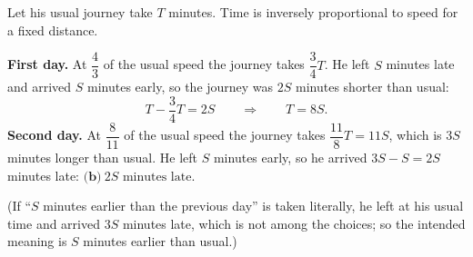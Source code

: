 Let his usual journey take $T$ minutes. Time is inversely proportional to speed for a fixed distance.

\textbf{First day.} At $\dfrac{4}{3}$ of the usual speed the journey takes $\dfrac{3}{4}T$. He left $S$ minutes late and arrived $S$ minutes early, so the journey was $2S$ minutes shorter than usual:
\[
T-\dfrac{3}{4}T=2S\qquad\Longrightarrow\qquad T=8S .
\]
\textbf{Second day.} At $\dfrac{8}{11}$ of the usual speed the journey takes $\dfrac{11}{8}T=11S$, which is $3S$ minutes longer than usual. He left $S$ minutes early, so he arrived $3S-S=2S$ minutes late: $\boxed{\textbf{(b)}\ 2S\text{ minutes late}}$.

(If ``$S$ minutes earlier than the previous day'' is taken literally, he left at his usual time and arrived $3S$ minutes late, which is not among the choices; so the intended meaning is $S$ minutes earlier than usual.)
